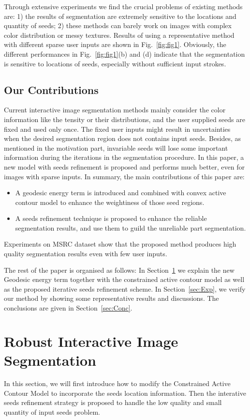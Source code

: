 \documentclass{article}
\begin{document}
%

Through extensive experiments we find the crucial problems of existing methods are: 1) the results of segmentation are extremely sensitive to the locations and quantity of seeds; 2) these methods can barely work on images with complex color distribution or messy textures. Results of using a representative method \cite{nguyen2012robust} with different sparse user inputs are shown in Fig.~\ref{fig:fig1}. Obviously, the different performances in Fig.~\ref{fig:fig1}(b) and (d) indicate that the segmentation is sensitive to locations of seeds, especially without sufficient input strokes.
%
\subsection{Our Contributions}
%
Current interactive image segmentation methods mainly consider the color information like the tensity or their distributions, and the user supplied seeds are fixed and used only once. The fixed user inputs might result in uncertainties when the desired segmentation region does not contains input seeds. Besides, as mentioned in the motivation part, invariable seeds will lose some important information during the iterations in the segmentation procedure. In this paper, a new model with seeds refinement is proposed and performs much better, even for images with sparse inputs.
%
In summary, the main contributions of this paper are:
\begin{itemize}
\item A geodesic energy term is introduced and combined with convex active contour model to enhance the weightiness of those seed regions.
\item A seeds refinement technique is proposed to enhance the reliable segmentation results, and use them to guild the unreliable part segmentation.
\end{itemize}
Experiments on MSRC dataset show that the proposed method produces high quality segmentation results even with few user inputs.
%

The rest of the paper is organised as follows: In Section~\ref{sec:geoenergy} we explain the new Geodesic energy term together with the constrained active contour model as well as the proposed iterative seeds refinement scheme. In Section~\ref{sec:Exp}, we verify our method by showing some representative results and discussions. The conclusions are given in Section~\ref{sec:Conc}.
%
\vspace{-3mm}
\section{Robust Interactive Image Segmentation}
\label{sec:geoenergy}
In this section, we will first introduce how to modify the Constrained Active Contour Model to incorporate the seeds location information. Then the interative seeds refinement strategy is proposed to handle the low quality and small quantity of input seeds problem.
%
\end{document}
